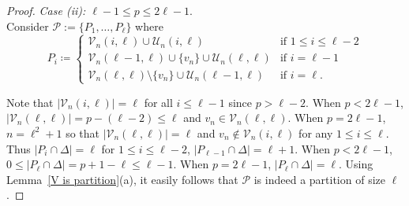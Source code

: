 \documentclass[11pt]{amsart}
\newtheorem{claim}{Claim}
\DeclareMathOperator{\Alt}{Alt}
\DeclareMathOperator{\Diag}{Diag}
\begin{document}
\begin{proof}


\emph{Case (ii): \(\ell-1 \leqslant p \leqslant 2\ell-1\)}.\\
Consider \(\mathcal{P}:=\{P_{1},\ldots, P_{\ell}\}\) where
\begin{equation*} 
P_{i}  \coloneqq
\begin{cases}
   \mathcal{V}_n(i,\ell) \cup \mathcal{U}_n(i,\ell)& \text{if } 1\leqslant i \leqslant \ell-2\\ 
    \mathcal{V}_n(\ell-1,\ell) \cup \{v_n\}\cup \mathcal{U}_n(\ell,\ell)& \text{if } i= \ell-1\\ 
   \mathcal{V}_n(\ell,\ell)\setminus \{v_n\} \cup \mathcal{U}_n(\ell-1,\ell)& \text{if } i=\ell.
\end{cases}
\end{equation*} 

Note that $|\mathcal{V}_n(i,\ell)|=\ell$ for all $i\leqslant \ell-1$ since $p>\ell-2$. When $p<2\ell-1$, $|\mathcal{V}_n(\ell,\ell)|=p-(\ell-2)\leqslant \ell$ and $v_{n}\in \mathcal{V}_n(\ell,\ell)$. When $p=2\ell-1$, $n=\ell^2+1$ so that $|\mathcal{V}_n(\ell,\ell)|=\ell$ and $v_{n}\notin \mathcal{V}_n(i,\ell)$ for any $1\leq i\leq \ell$. 
Thus $|P_{i}\cap\Delta|=\ell$ for $1\leqslant i \leqslant \ell-2$, $|P_{\ell-1}\cap\Delta|=\ell+1$.
 When $p<2\ell-1$, $0\leqslant |P_{\ell}\cap\Delta|=p+1-\ell\leqslant\ell-1$.
 When $p=2\ell-1$, $|P_{\ell}\cap\Delta|=\ell$.
 Using Lemma~\ref{V is partition}(a), it easily follows that \(\mathcal{P}\) is indeed a partition of size $\ell$. 


\end{proof}
\end{document}
